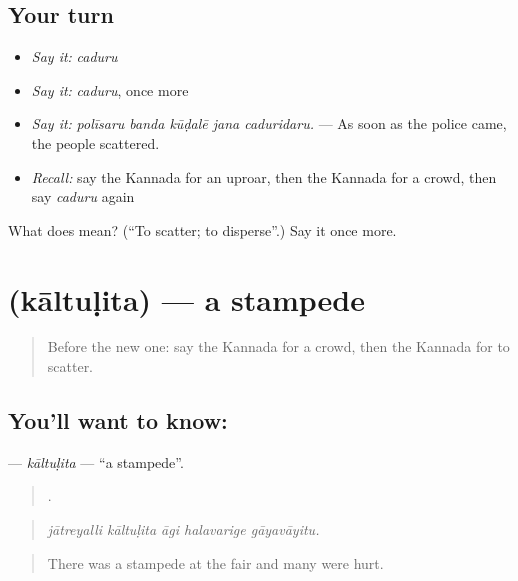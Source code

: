 \subsection*{Your turn}
\begin{itemize}
\raggedright
  \item \emph{Say it:} \emph{caduru}
  \item \emph{Say it:} \emph{caduru}, once more
  \item \emph{Say it:} \emph{polīsaru banda kūḍalē jana caduridaru.} — As soon as the police came, the people scattered.
  \item \emph{Recall:} say the Kannada for an uproar, then the Kannada for a crowd, then say \emph{caduru} again
\end{itemize}

\begin{tcolorbox}[breakable,colback=teal!4,colframe=teal!35!black,title={Before you move on}]
What does  mean? (\textquotedblleft{}To scatter; to disperse\textquotedblright{}.) Say it once more.
\end{tcolorbox}
\section[\texorpdfstring{\kn{ಕಾಲ್ತುಳಿತ} (kāltuḷita)}{ಕಾಲ್ತುಳಿತ (kāltuḷita)}]{ (kāltuḷita) — a stampede}

\label{lesson:KA-C339-kaltulita}



\begin{quote}
Before the new one: say the Kannada for a crowd, then the Kannada for to scatter.
\end{quote}

\subsection*{You'll want to know: }
\textbf{} — \emph{kāltuḷita} — \textquotedblleft{}a stampede\textquotedblright{}.

\begin{quote}
    .
\end{quote}

\begin{quote}
\emph{jātreyalli kāltuḷita āgi halavarige gāyavāyitu.}
\end{quote}

\begin{quote}
There was a stampede at the fair and many were hurt.
\end{quote}

